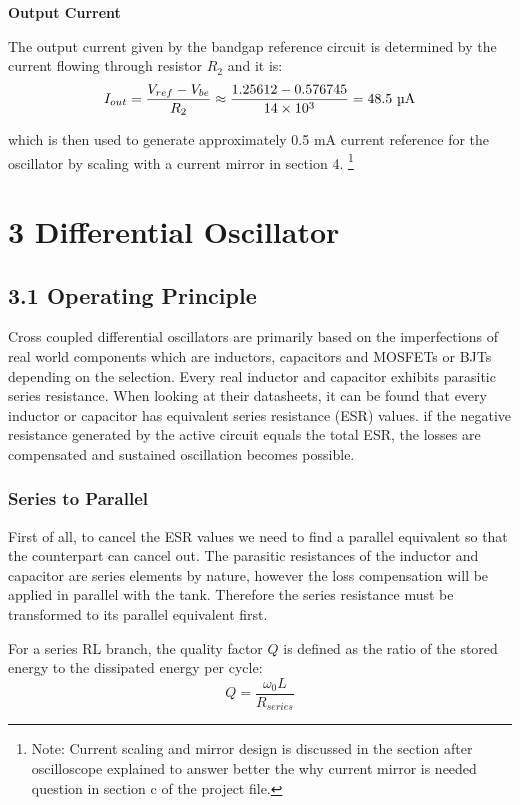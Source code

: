 \documentclass[12pt]{article}
\begin{document}
\textbf{Output Current}

The output current given by the bandgap reference circuit is determined by the current flowing through resistor $R_2$ and it is: 
\begin{equation}
I_{out} = \frac{V_{ref}- V_{be}}{R_2} \approx \frac{1.25612 - 0.576745}{14 \times 10^3} = 48.5 \text{ \textmu A}
\end{equation}

which is then used to generate approximately 0.5 mA current reference for the oscillator by scaling with a current mirror in section 4.
\footnote{
Note: Current scaling and mirror design is discussed in the section after oscilloscope explained to answer better the why current mirror is needed question in section c of the project file. }
\newpage
\section*{3 Differential Oscillator}

\subsection*{3.1 Operating Principle}
Cross coupled differential oscillators are primarily based on the imperfections of real world components which are inductors, capacitors and MOSFETs or BJTs depending on the selection. Every real inductor and capacitor exhibits parasitic series resistance. When looking at their datasheets, it can be found that every inductor or capacitor has equivalent series resistance (ESR) values. if the negative resistance generated by the active circuit equals the total ESR, the losses are compensated and sustained oscillation becomes possible. 

\subsubsection*{Series to Parallel}

First of all, to cancel the ESR values we need to find a parallel equivalent so that the counterpart can cancel out. The parasitic resistances of the inductor and capacitor are series elements by nature, however the loss compensation will be applied in parallel with the tank. Therefore the series resistance must be transformed to its parallel equivalent first.

For a series RL branch, the quality factor $Q$ is defined as the ratio of the stored energy to the dissipated energy per cycle:
\begin{equation}
Q = \frac{\omega_0 L}{R_{series}}
\end{equation}
\end{document}
